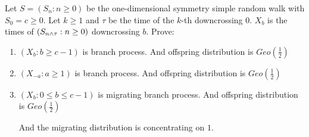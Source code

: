 \documentclass[../main]{subfiles}
\begin{document}
\begin{problem}\label{pro:1}
  Let \(S=(S_n:n \geq 0)\) be the one-dimensional symmetry simple random walk with \(S_0=c \geq 0\).
  Let \(k \geq 1\) and \(\tau\) be the time of the \(k\)-th downcrossing \(0\).
  \(X_b\) is the times of \((S_{n \wedge \tau}:n \geq 0)\) downcrossing \(b\). Prove:
  \begin{enumerate}
    \item \((X_b:b \geq c-1)\) is branch process.
      And offspring distribution is \(Geo(\frac{1}{2})\)

    \item \((X_{-a}:a \geq 1)\) is branch process.
      And offspring distribution is \(Geo(\frac{1}{2})\)

    \item \((X_b:0 \leq b \leq c-1)\) is migrating branch process.
      And offspring distribution is \(Geo(\frac{1}{2})\)

      And the migrating distribution is concentrating on \(1\).

  \end{enumerate}
\end{problem}
\end{document}
